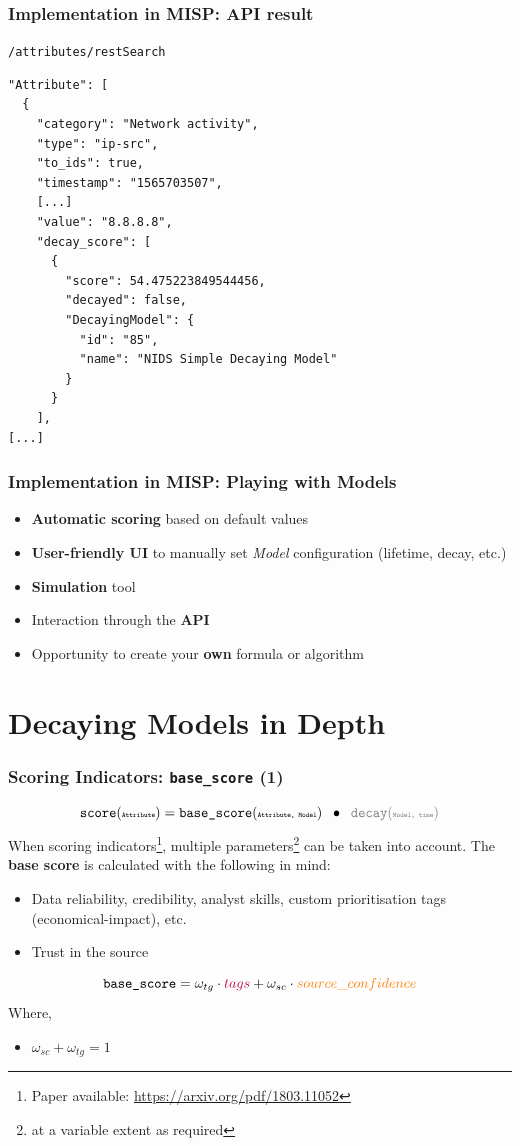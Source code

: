 \begin{frame}[fragile]
    \frametitle{Implementation in MISP: API result}
    \texttt{/attributes/restSearch}
    \begin{lstlisting}
"Attribute": [
  {
    "category": "Network activity",
    "type": "ip-src",
    "to_ids": true,
    "timestamp": "1565703507",
    [...]
    "value": "8.8.8.8",
    "decay_score": [
      {
        "score": 54.475223849544456,
        "decayed": false,
        "DecayingModel": {
          "id": "85",
          "name": "NIDS Simple Decaying Model"
        }
      }
    ],
[...]
    \end{lstlisting}
\end{frame}

\begin{frame}
\frametitle{Implementation in MISP: Playing with Models}
    \begin{itemize}
        \item \textbf{Automatic scoring} based on default values
        \item \textbf{User-friendly UI} to manually set \textit{Model} configuration (lifetime, decay, etc.)
        \item \textbf{Simulation} tool
        \item Interaction through the \textbf{API}
        \item Opportunity to create your \textbf{own} formula or algorithm
    \end{itemize}
\end{frame}

\section{Decaying Models in Depth}
\begin{frame}
    \frametitle{Scoring Indicators: \texttt{base\_score} (1)}
    $$ \texttt{score}(\texttt{\tiny Attribute}) = \texttt{base\_score}(\texttt{\tiny Attribute, Model}) \;\;\bullet\;\; {\color{gray}\texttt{decay}(\texttt{\tiny Model, time})} $$
        When scoring indicators\footnote{Paper available: \url{https://arxiv.org/pdf/1803.11052}}, multiple parameters\footnote{at a variable extent as required} can be taken into account. The {\bf base score} is calculated with the following in mind:
    \begin{itemize}
        \item {\color{purple}Data reliability, credibility, analyst skills, custom prioritisation tags (economical-impact), etc.}
        \item {\color{orange}Trust in the source}
    \end{itemize}
    \vspace{0.3cm}
    $$\texttt{base\_score} = \omega_{tg} \cdot {\color{purple}tags} + \omega_{sc} \cdot {\color{orange}source\_confidence}$$
    Where,
    \begin{itemize}
        \item[] $\omega_{sc} + \omega_{tg} = 1$
    \end{itemize}
\end{frame}

